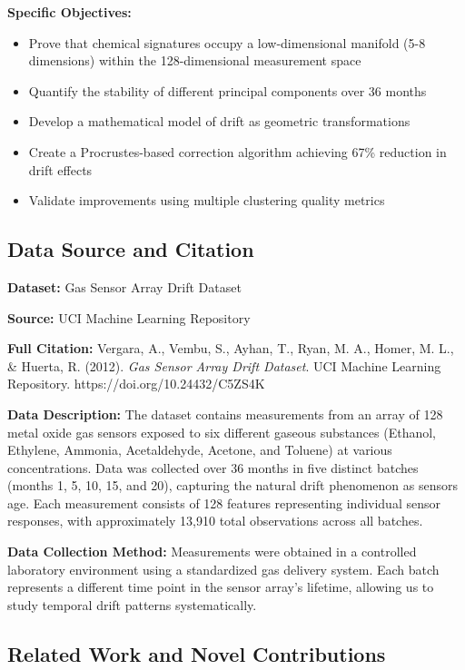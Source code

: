 \documentclass[
  letterpaper,
  DIV=11,
  numbers=noendperiod]{scrartcl}
\providecommand{\tightlist}{%
  \setlength{\itemsep}{0pt}\setlength{\parskip}{0pt}}
\begin{document}
\textbf{Specific Objectives:}

\begin{itemize}
\tightlist
\item
  Prove that chemical signatures occupy a low-dimensional manifold (5-8
  dimensions) within the 128-dimensional measurement space
\item
  Quantify the stability of different principal components over 36
  months
\item
  Develop a mathematical model of drift as geometric transformations
\item
  Create a Procrustes-based correction algorithm achieving 67\%
  reduction in drift effects
\item
  Validate improvements using multiple clustering quality metrics
\end{itemize}

\subsection{Data Source and Citation}\label{data-source-and-citation}

\textbf{Dataset:} Gas Sensor Array Drift Dataset

\textbf{Source:} UCI Machine Learning Repository

\textbf{Full Citation:} Vergara, A., Vembu, S., Ayhan, T., Ryan, M. A.,
Homer, M. L., \& Huerta, R. (2012). \emph{Gas Sensor Array Drift
Dataset}. UCI Machine Learning Repository.
https://doi.org/10.24432/C5ZS4K

\textbf{Data Description:} The dataset contains measurements from an
array of 128 metal oxide gas sensors exposed to six different gaseous
substances (Ethanol, Ethylene, Ammonia, Acetaldehyde, Acetone, and
Toluene) at various concentrations. Data was collected over 36 months in
five distinct batches (months 1, 5, 10, 15, and 20), capturing the
natural drift phenomenon as sensors age. Each measurement consists of
128 features representing individual sensor responses, with
approximately 13,910 total observations across all batches.

\textbf{Data Collection Method:} Measurements were obtained in a
controlled laboratory environment using a standardized gas delivery
system. Each batch represents a different time point in the sensor
array's lifetime, allowing us to study temporal drift patterns
systematically.

\subsection{Related Work and Novel
Contributions}\label{related-work-and-novel-contributions}
\end{document}
